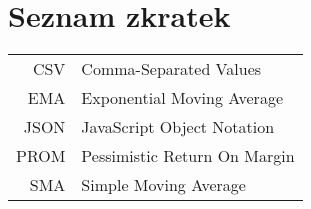 \documentclass[czech,master,unicode]{ctufit-thesis}
\theoremstyle{plain}
\theoremstyle{definition}
\theoremstyle{remark}
\numberwithin{theorem}{chapter}
\begin{document}
\printabstractpage %











\chapter{Seznam zkratek}
	
\begin{tabular}{rl}
CSV & Comma-Separated Values\\
EMA & Exponential Moving Average\\
JSON & JavaScript Object Notation\\
PROM & Pessimistic Return On Margin\\
SMA & Simple Moving Average\\
\end{tabular}
\end{document}
